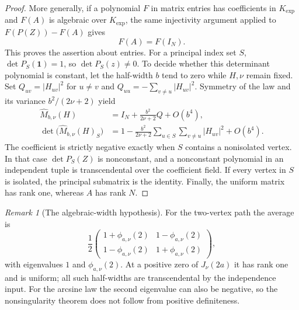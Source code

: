 \documentclass[11pt]{article}
\theoremstyle{definition}
\theoremstyle{remark}
\newtheorem{remark}[theorem]{Remark}
\newcommand{\Kexp}{K_{\mathrm{exp}}}
\begin{document}
\begin{proof}
More generally, if a polynomial $F$ in matrix entries has coefficients
in $\Kexp$ and $F(A)$ is algebraic over $\Kexp$, the same injectivity
argument applied to $F(P(Z))-F(A)$ gives
\begin{equation}
\label{qmix:invariant}
 F(A)=F(I_N).
\end{equation}
This proves the assertion about entries. For a principal index set $S$,
$\det P_S(\mathbf1)=1$, so $\det P_S(z)\ne0$.
To decide whether this determinant polynomial is constant, let the
half-width $b$ tend to zero while $H,\nu$ remain fixed. Set
$Q_{uv}=|H_{uv}|^2$ for $u\ne v$ and
$Q_{uu}=-\sum_{v\ne u}|H_{uv}|^2$.
Symmetry of the law and its variance $b^2/(2\nu+2)$ yield
\begin{align*}
 \widehat M_{b,\nu}(H)&=I_N+\frac{b^2}{2\nu+2}Q+O(b^4),\\
 \det\bigl(\widehat M_{b,\nu}(H)_S\bigr)
 &=1-\frac{b^2}{2\nu+2}
       \sum_{u\in S}\sum_{v\ne u}|H_{uv}|^2+O(b^4).
\end{align*}
The coefficient is strictly negative exactly when $S$ contains a
nonisolated vertex. In that case $\det P_S(Z)$ is nonconstant, and
a nonconstant polynomial in an independent tuple is transcendental
over the coefficient field. If every vertex in $S$ is isolated, the
principal submatrix is the identity. Finally, the uniform matrix has
rank one, whereas $A$ has rank $N$.
\end{proof}

\begin{remark}[The algebraic-width hypothesis]
\label{qmix:p2}
For the two-vertex path the average is
\[
 \frac12\begin{pmatrix}
 1+\phi_{a,\nu}(2)&1-\phi_{a,\nu}(2)\\
 1-\phi_{a,\nu}(2)&1+\phi_{a,\nu}(2)
 \end{pmatrix},
\]
with eigenvalues $1$ and $\phi_{a,\nu}(2)$.
At a positive zero of $J_\nu(2a)$ it has rank one and is uniform;
all such half-widths are transcendental by the independence input.
For the arcsine law the second eigenvalue can also be negative, so
the nonsingularity theorem does not follow from positive definiteness.
\end{remark}
\end{document}
